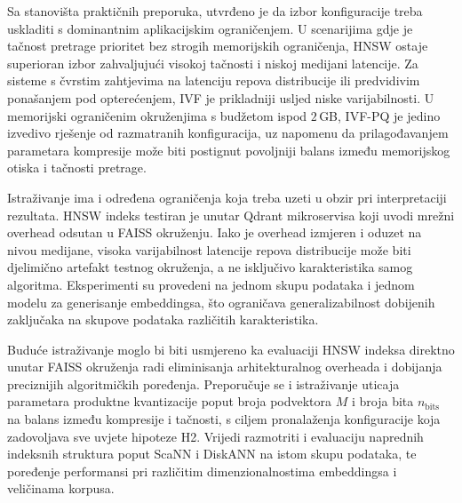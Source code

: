 Sa stanovišta praktičnih preporuka, utvrđeno je da
izbor konfiguracije treba uskladiti s dominantnim
aplikacijskim ograničenjem.
U scenarijima gdje je tačnost pretrage prioritet bez
strogih memorijskih ograničenja,
\foreignlanguage{english}{HNSW} ostaje superioran
izbor zahvaljujući visokoj tačnosti i niskoj medijani
latencije.
Za sisteme s čvrstim zahtjevima na latenciju repova
distribucije ili predvidivim ponašanjem pod
opterećenjem, \foreignlanguage{english}{IVF} je
prikladniji usljed niske varijabilnosti.
U memorijski ograničenim okruženjima s budžetom
ispod $2$\,GB,
\foreignlanguage{english}{IVF-PQ} je jedino izvedivo
rješenje od razmatranih konfiguracija, uz napomenu
da prilagođavanjem parametara kompresije može biti
postignut povoljniji balans između memorijskog otiska
i tačnosti pretrage.

Istraživanje ima i određena ograničenja koja treba
uzeti u obzir pri interpretaciji rezultata.
\foreignlanguage{english}{HNSW} indeks testiran je
unutar \foreignlanguage{english}{Qdrant} mikroservisa
koji uvodi mrežni overhead odsutan u
\foreignlanguage{english}{FAISS} okruženju.
Iako je overhead izmjeren i oduzet na nivou medijane,
visoka varijabilnost latencije repova distribucije
može biti djelimično artefakt testnog okruženja, a ne
isključivo karakteristika samog algoritma.
Eksperimenti su provedeni na jednom skupu podataka
i jednom modelu za generisanje embeddingsa, što
ograničava generalizabilnost dobijenih zaključaka
na skupove podataka različitih karakteristika.

Buduće istraživanje moglo bi biti usmjereno ka
evaluaciji \foreignlanguage{english}{HNSW} indeksa
direktno unutar \foreignlanguage{english}{FAISS}
okruženja radi eliminisanja arhitekturalnog overheada
i dobijanja preciznijih algoritmičkih poređenja.
Preporučuje se i istraživanje uticaja parametara
produktne kvantizacije poput broja podvektora $M$
i broja bita $n_{\mathrm{bits}}$ na balans između
kompresije i tačnosti, s ciljem pronalaženja
konfiguracije koja zadovoljava sve uvjete hipoteze H2.
Vrijedi razmotriti i evaluaciju naprednih indeksnih
struktura poput \foreignlanguage{english}{ScaNN} i
\foreignlanguage{english}{DiskANN} na istom skupu
podataka, te poređenje performansi pri različitim
dimenzionalnostima embeddingsa i veličinama korpusa.
